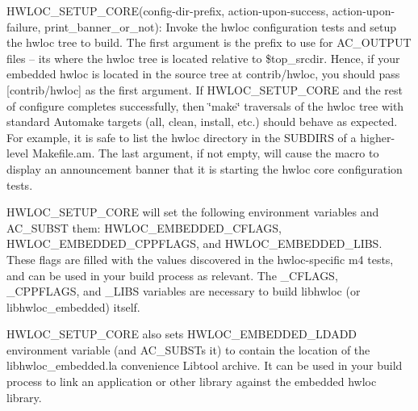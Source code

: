 \begin{DoxyItemize}
\item H\+W\+L\+O\+C\+\_\+\+S\+E\+T\+U\+P\+\_\+\+C\+O\+RE(config-\/dir-\/prefix, action-\/upon-\/success, action-\/upon-\/failure, print\+\_\+banner\+\_\+or\+\_\+not)\+: Invoke the hwloc configuration tests and setup the hwloc tree to build. The first argument is the prefix to use for A\+C\+\_\+\+O\+U\+T\+P\+UT files -- it\textquotesingle{}s where the hwloc tree is located relative to {\ttfamily \$top\+\_\+srcdir}. Hence, if your embedded hwloc is located in the source tree at contrib/hwloc, you should pass {\ttfamily \mbox{[}contrib/hwloc\mbox{]}} as the first argument. If H\+W\+L\+O\+C\+\_\+\+S\+E\+T\+U\+P\+\_\+\+C\+O\+RE and the rest of {\ttfamily configure} completes successfully, then \char`\"{}make\char`\"{} traversals of the hwloc tree with standard Automake targets (all, clean, install, etc.) should behave as expected. For example, it is safe to list the hwloc directory in the S\+U\+B\+D\+I\+RS of a higher-\/level Makefile.\+am. The last argument, if not empty, will cause the macro to display an announcement banner that it is starting the hwloc core configuration tests.

H\+W\+L\+O\+C\+\_\+\+S\+E\+T\+U\+P\+\_\+\+C\+O\+RE will set the following environment variables and A\+C\+\_\+\+S\+U\+B\+ST them\+: H\+W\+L\+O\+C\+\_\+\+E\+M\+B\+E\+D\+D\+E\+D\+\_\+\+C\+F\+L\+A\+GS, H\+W\+L\+O\+C\+\_\+\+E\+M\+B\+E\+D\+D\+E\+D\+\_\+\+C\+P\+P\+F\+L\+A\+GS, and H\+W\+L\+O\+C\+\_\+\+E\+M\+B\+E\+D\+D\+E\+D\+\_\+\+L\+I\+BS. These flags are filled with the values discovered in the hwloc-\/specific m4 tests, and can be used in your build process as relevant. The \+\_\+\+C\+F\+L\+A\+GS, \+\_\+\+C\+P\+P\+F\+L\+A\+GS, and \+\_\+\+L\+I\+BS variables are necessary to build libhwloc (or libhwloc\+\_\+embedded) itself.

H\+W\+L\+O\+C\+\_\+\+S\+E\+T\+U\+P\+\_\+\+C\+O\+RE also sets H\+W\+L\+O\+C\+\_\+\+E\+M\+B\+E\+D\+D\+E\+D\+\_\+\+L\+D\+A\+DD environment variable (and A\+C\+\_\+\+S\+U\+B\+S\+Ts it) to contain the location of the libhwloc\+\_\+embedded.\+la convenience Libtool archive. It can be used in your build process to link an application or other library against the embedded hwloc library.


\end{DoxyItemize}
